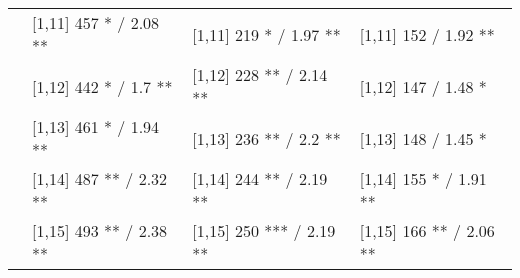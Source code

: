\begin{table}
\begin{tabular}[t]{llll}
 & {}[1,11] 457 * / 2.08 ** & {}[1,11] 219 * / 1.97 ** & {}[1,11] 152  / 1.92 **\\
 & {}[1,12] 442 * / 1.7 ** & {}[1,12] 228 ** / 2.14 ** & {}[1,12] 147  / 1.48 *\\
\addlinespace
 & {}[1,13] 461 * / 1.94 ** & {}[1,13] 236 ** / 2.2 ** & {}[1,13] 148  / 1.45 *\\
 & {}[1,14] 487 ** / 2.32 ** & {}[1,14] 244 ** / 2.19 ** & {}[1,14] 155 * / 1.91 **\\
 & {}[1,15] 493 ** / 2.38 ** & {}[1,15] 250 *** / 2.19 ** & {}[1,15] 166 ** / 2.06 **\\
\bottomrule
\end{tabular}
\end{table}

